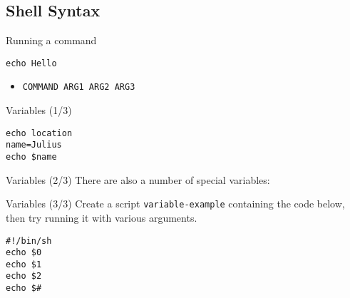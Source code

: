 \documentclass[12pt]{beamer}
\begin{document}
\subsection{Shell Syntax}
\begin{frame}[fragile]{Running a command}
  \begin{verbatim}echo Hello
    \end{verbatim}
  \begin{itemize}
    \item \texttt{COMMAND ARG1 ARG2 ARG3}
  \end{itemize}
\end{frame}

\begin{frame}[fragile]{Variables (1/3)}
  \begin{verbatim}
echo location
name=Julius
echo $name
\end{verbatim}
\end{frame}

\begin{frame}[fragile]{Variables (2/3)}
  There are also a number of special variables:
\end{frame}

\begin{frame}[fragile]{Variables (3/3)}
  Create a script \texttt{variable-example} containing the code below, then try running it with various arguments.
  \begin{verbatim}
#!/bin/sh
echo $0
echo $1
echo $2
echo $#
\end{verbatim}

\end{frame}
\end{document}
